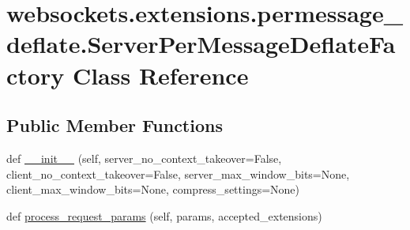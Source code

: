 \hypertarget{classwebsockets_1_1extensions_1_1permessage__deflate_1_1_server_per_message_deflate_factory}{}\section{websockets.\+extensions.\+permessage\+\_\+deflate.\+Server\+Per\+Message\+Deflate\+Factory Class Reference}
\label{classwebsockets_1_1extensions_1_1permessage__deflate_1_1_server_per_message_deflate_factory}
\subsection*{Public Member Functions}
\begin{DoxyCompactItemize}
\item 
def \hyperlink{classwebsockets_1_1extensions_1_1permessage__deflate_1_1_server_per_message_deflate_factory_ae6a7b7e3f1dcf87d99129eba9f1c960a}{\+\_\+\+\_\+init\+\_\+\+\_\+} (self, server\+\_\+no\+\_\+context\+\_\+takeover=False, client\+\_\+no\+\_\+context\+\_\+takeover=False, server\+\_\+max\+\_\+window\+\_\+bits=None, client\+\_\+max\+\_\+window\+\_\+bits=None, compress\+\_\+settings=None)
\item 
def \hyperlink{classwebsockets_1_1extensions_1_1permessage__deflate_1_1_server_per_message_deflate_factory_a56cff23a66fc604f79b24027eb5d16f0}{process\+\_\+request\+\_\+params} (self, params, accepted\+\_\+extensions)
\end{DoxyCompactItemize}
